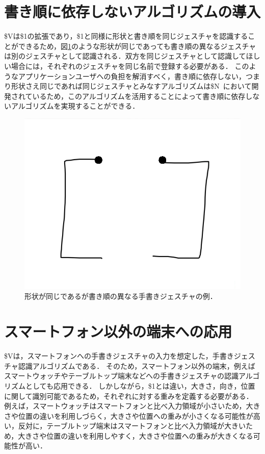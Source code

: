 \section{書き順に依存しないアルゴリズムの導入}
\$Vは\$1の拡張であり，\$1と同様に形状と書き順を同じジェスチャを認識することができるため，図\ref{fig:different_direction}のような形状が同じであっても書き順の異なるジェスチャは別のジェスチャとして認識される．双方を同じジェスチャとして認識してほしい場合には，それぞれのジェスチャを同じ名前で登録する必要がある．
このようなアプリケーションユーザへの負担を解消すべく，書き順に依存しない，つまり形状さえ同じであれば同じジェスチャとみなすアルゴリズムは\$N~\cite{Anthony:2010:LMR:1839214.1839258}において開発されているため，このアルゴリズムを活用することによって書き順に依存しないアルゴリズムを実現することができる．

\begin{figure} [h!]
	\begin{center}
		\includegraphics [width=0.5\hsize ]{img/different_direction.eps}
	\end{center}
	\caption{形状が同じであるが書き順の異なる手書きジェスチャの例．}
	\label{fig:different_direction}
\end{figure}


\section{スマートフォン以外の端末への応用}
\$Vは，スマートフォンへの手書きジェスチャの入力を想定した，手書きジェスチャ認識アルゴリズムである．
そのため，スマートフォン以外の端末，例えばスマートウォッチやテーブルトップ端末などへの手書きジェスチャの認識アルゴリズムとしても応用できる．
しかしながら，\$1とは違い，大きさ，向き，位置に関して識別可能であるため，それぞれに対する重みを定義する必要がある．
例えば，スマートウォッチはスマートフォンと比べ入力領域が小さいため，大きさや位置の違いを利用しづらく，大きさや位置への重みが小さくなる可能性が高い，反対に，テーブルトップ端末はスマートフォンと比べ入力領域が大きいため，大きさや位置の違いを利用しやすく，大きさや位置への重みが大きくなる可能性が高い．

